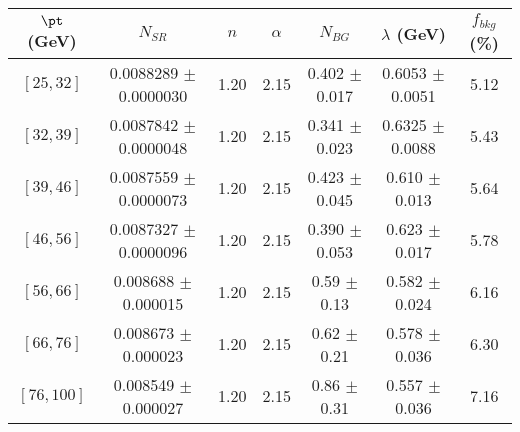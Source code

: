 \begin{tabular}{c||c|c|c|c|c||c}
$\pt$ (GeV) & $N_{SR}$ & $n$ & $\alpha$ & $N_{BG}$  & $\lambda$ (GeV) & $f_{bkg}$ (\%) \\
\hline
$[25, 32]$ & 0.0088289 $\pm$ 0.0000030 & 1.20 & 2.15 & 0.402 $\pm$ 0.017 & 0.6053 $\pm$ 0.0051 & 5.12\\
$[32, 39]$ & 0.0087842 $\pm$ 0.0000048 & 1.20 & 2.15 & 0.341 $\pm$ 0.023 & 0.6325 $\pm$ 0.0088 & 5.43\\
$[39, 46]$ & 0.0087559 $\pm$ 0.0000073 & 1.20 & 2.15 & 0.423 $\pm$ 0.045 & 0.610 $\pm$ 0.013 & 5.64\\
$[46, 56]$ & 0.0087327 $\pm$ 0.0000096 & 1.20 & 2.15 & 0.390 $\pm$ 0.053 & 0.623 $\pm$ 0.017 & 5.78\\
$[56, 66]$ & 0.008688 $\pm$ 0.000015 & 1.20 & 2.15 & 0.59 $\pm$ 0.13 & 0.582 $\pm$ 0.024 & 6.16\\
$[66, 76]$ & 0.008673 $\pm$ 0.000023 & 1.20 & 2.15 & 0.62 $\pm$ 0.21 & 0.578 $\pm$ 0.036 & 6.30\\
$[76, 100]$ & 0.008549 $\pm$ 0.000027 & 1.20 & 2.15 & 0.86 $\pm$ 0.31 & 0.557 $\pm$ 0.036 & 7.16\\
\end{tabular}

